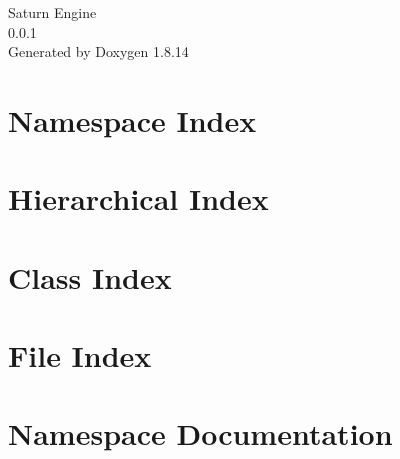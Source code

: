 \documentclass[twoside]{book}
\newcommand{\+}{\discretionary{\mbox{\scriptsize$\hookleftarrow$}}{}{}}
\newcommand{\clearemptydoublepage}{%
  \newpage{\pagestyle{empty}\cleardoublepage}%
}
\begin{document}
\hypersetup{pageanchor=false,
             bookmarksnumbered=true,
             pdfencoding=unicode
            }
\begin{titlepage}
\vspace*{7cm}
\begin{center}%
{\Large Saturn Engine \\[1ex]\large 0.\+0.\+1 }\\
\vspace*{1cm}
{\large Generated by Doxygen 1.8.14}\\
\end{center}
\end{titlepage}
\clearemptydoublepage
{}
\tableofcontents
\clearemptydoublepage
{}
\hypersetup{pageanchor=true}

\chapter{Namespace Index}

\chapter{Hierarchical Index}

\chapter{Class Index}

\chapter{File Index}

\chapter{Namespace Documentation}




\end{document}
